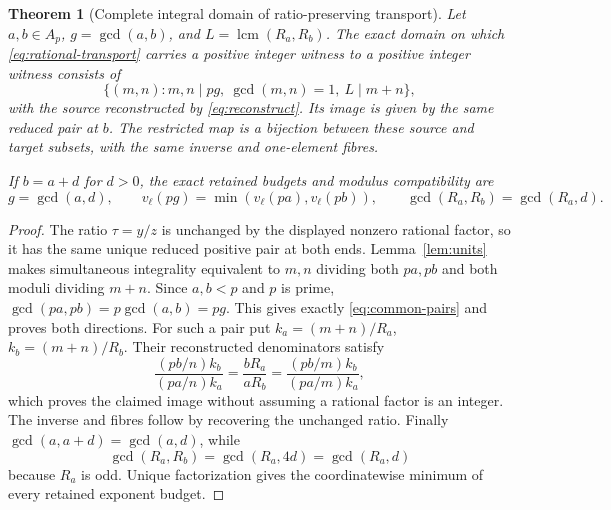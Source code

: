\documentclass[11pt]{article}
\newtheorem{theorem}{Theorem}[section]
\theoremstyle{definition}\newtheorem{definition}[theorem]{Definition}
\theoremstyle{remark}\newtheorem{remark}[theorem]{Remark}
\DeclareMathOperator{\lcm}{lcm}
\begin{document}
\begin{theorem}[Complete integral domain of ratio-preserving transport]\label{thm:ratio}
Let \(a,b\in A_p\), \(g=\gcd(a,b)\), and \(L=\lcm(R_a,R_b)\).
The exact domain on which \eqref{eq:rational-transport} carries a
positive integer witness to a positive integer witness consists of
\begin{equation}\label{eq:common-pairs}
 \{(m,n):m,n\mid pg,\ \gcd(m,n)=1,\ L\mid m+n\},
\end{equation}
with the source reconstructed by \eqref{eq:reconstruct}.
Its image is given by the same reduced pair at \(b\).
The restricted map is a bijection between these source and target
subsets, with the same inverse and one-element fibres.

If \(b=a+d\) for \(d>0\), the exact retained budgets and modulus
compatibility are
\[
 g=\gcd(a,d),\qquad
 v_\ell(pg)=\min(v_\ell(pa),v_\ell(pb)),\qquad
 \gcd(R_a,R_b)=\gcd(R_a,d).
\]
\end{theorem}
\begin{proof}
The ratio \(\tau=y/z\) is unchanged by the displayed nonzero
rational factor, so it has the same unique reduced positive pair
at both ends.  Lemma~\ref{lem:units} makes simultaneous integrality
equivalent to \(m,n\) dividing both \(pa,pb\) and both moduli
dividing \(m+n\).  Since \(a,b<p\) and \(p\) is prime,
\(\gcd(pa,pb)=p\gcd(a,b)=pg\).  This gives exactly
\eqref{eq:common-pairs} and proves both directions.  For such
a pair put \(k_a=(m+n)/R_a\), \(k_b=(m+n)/R_b\).
Their reconstructed denominators satisfy
\[
 \frac{(pb/n)k_b}{(pa/n)k_a}
  =\frac{bR_a}{aR_b}
  =\frac{(pb/m)k_b}{(pa/m)k_a},
\]
which proves the claimed image without assuming a rational
factor is an integer.  The inverse and fibres follow by
recovering the unchanged ratio.  Finally
\(\gcd(a,a+d)=\gcd(a,d)\), while
\[
 \gcd(R_a,R_b)=\gcd(R_a,4d)=\gcd(R_a,d)
\]
because \(R_a\) is odd.  Unique factorization gives the
coordinatewise minimum of every retained exponent budget.
\end{proof}
\end{document}
